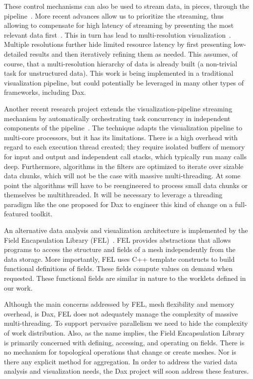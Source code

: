 \documentclass{vgtc}                          %
\newcommand*{\lcite}[1]{~\cite{#1}}
\begin{document}
These control mechanisms can also be used to stream data, in pieces,
through the pipeline\lcite{Ahrens01}.  More recent advances allow us to
prioritize the streaming, thus allowing to compensate for high latency of
streaming by presenting the most relevant data first\lcite{Ahrens07}.  This
in turn has lead to multi-resolution
visualization\lcite{Pascucci01,Woodring09}.  Multiple resolutions further
hide limited resource latency by first presenting low-detailed results and
then iteratively refining them as needed.  This assumes, of course, that a
multi-resolution hierarchy of data is already built (a non-trivial task for
unstructured data).  This work is being implemented in a traditional
visualization pipeline, but could potentially be leveraged in many other
types of frameworks, including Dax.

Another recent research project extends the visualization-pipeline
streaming mechanism by automatically orchestrating task concurrency in
independent components of the pipeline\lcite{Vo09}.  The technique adapts
the visualization pipeline to multi-core processors, but it has its
limitations.  There is a high overhead with regard to each execution thread
created; they require isolated buffers of memory for input and output and
independent call stacks, which typically run many calls deep.  Furthermore,
algorithms in the filters are optimized to iterate over sizable data
chunks, which will not be the case with massive multi-threading.  At some
point the algorithms will have to be reengineered to process small data
chunks or themselves be multithreaded.  It will be necessary to leverage a
threading paradigm like the one proposed for Dax to engineer this kind of
change on a full-featured toolkit.

An alternative data analysis and visualization architecture is implemented
by the Field Encapsulation Library (FEL)\lcite{FELPaper}.  FEL provides
abstractions that allows programs to access the structure and fields of a
mesh independently from the data storage.  More importantly, FEL uses C++
template constructs to build functional definitions of fields.  These
fields compute values on demand when requested.  These functional fields
are similar in nature to the worklets defined in our work.

Although the main concerns addressed by FEL, mesh flexibility and memory
overhead, is Dax, FEL does not adequately manage
the complexity of massive multi-threading.  To support pervasive parallelism
we need to hide the complexity of work distribution.  Also, as the name
implies, the Field Encapsulation Library is primarily concerned with
defining, accessing, and operating on fields.  There is no mechanism for
topological operations that change or create meshes.  Nor is there any
explicit method for aggregation.  In order to address the varied data
analysis and visualization needs, the Dax project will soon address these
features. 
\end{document}
